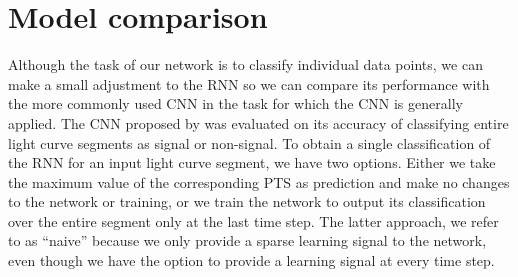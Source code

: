 \section{Model comparison}
\label{sec:models}

Although the task of our network is to classify individual data points, we can make a small adjustment to the RNN so we can compare its performance with the more commonly used CNN in the task for which the CNN is generally applied. The CNN proposed by \cite{pearson2018searching} was evaluated on its accuracy of classifying entire light curve segments as signal or non-signal. To obtain a single classification of the RNN for an input light curve segment, we have two options. Either we take the maximum value of the corresponding PTS as prediction and make no changes to the network or training, or we train the network to output its classification over the entire segment only at the last time step. The latter approach, we refer to as ``naive'' because we only provide a sparse learning signal to the network, even though we have the option to provide a learning signal at every time step. 

